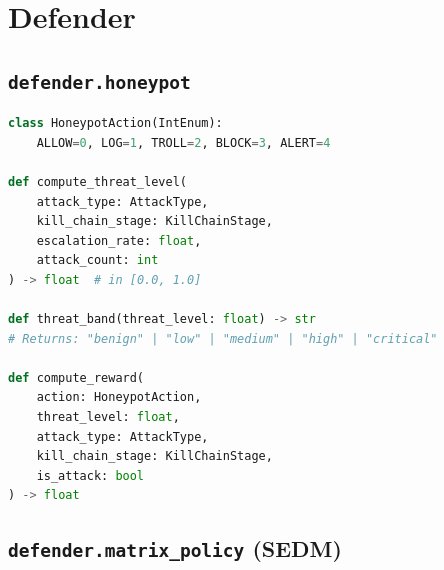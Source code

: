 \section{Defender}

\subsection{\texttt{defender.honeypot}}

\begin{lstlisting}[language=Python, caption={Honeypot action and reward computation (unchanged).}]
class HoneypotAction(IntEnum):
    ALLOW=0, LOG=1, TROLL=2, BLOCK=3, ALERT=4

def compute_threat_level(
    attack_type: AttackType,
    kill_chain_stage: KillChainStage,
    escalation_rate: float,
    attack_count: int
) -> float  # in [0.0, 1.0]

def threat_band(threat_level: float) -> str
# Returns: "benign" | "low" | "medium" | "high" | "critical"

def compute_reward(
    action: HoneypotAction,
    threat_level: float,
    attack_type: AttackType,
    kill_chain_stage: KillChainStage,
    is_attack: bool
) -> float
\end{lstlisting}

\subsection{\texttt{defender.matrix\_policy} (SEDM)}

